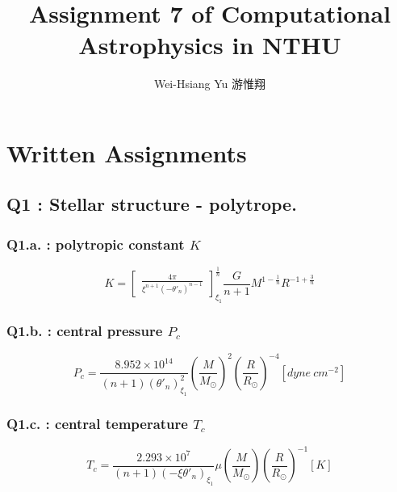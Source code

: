 \documentclass{article}
\title{Assignment 7 of Computational Astrophysics in NTHU}
\author{Wei-Hsiang Yu 游惟翔}
\affil{Department of Physics, National Tsing Hua University, Hsinchu, Taiwan}
\begin{document}
\begin{CJK}{UTF8}{bsmi}
\maketitle
\end{CJK}


\section{Written Assignments}
\subsection*{Q1 : Stellar structure - polytrope.}
\subsubsection*{Q1.a. : polytropic constant $K$}
\begin{equation}
    K=\begin{bmatrix}
        \frac{4\pi}{\xi^{n+1}(-\theta'_n)^{n-1}}
        \end{bmatrix}_{\xi_1}^{\frac{1}{n}}
      \frac{G}{n+1}M^{1-\frac{1}{n}}R^{-1+\frac{3}{n}}
      \label{eq:K}
\end{equation}

\subsubsection*{Q1.b. : central pressure $P_c$}
\begin{equation}
    P_{c}=\frac{8.952\times10^{14}}{(n+1)(\theta'_n)^2_{\xi_{1}}}
          (\frac{M}{M_{\odot}})^2(\frac{R}{R_{\odot}})^{-4}[dyne\ cm^{-2}]
    \label{eq:Pc}
\end{equation}

\subsubsection*{Q1.c. : central temperature $T_c$}
\begin{equation}
    T_c=\frac{2.293\times10^7}{(n+1)(-\xi\theta'_n)_{\xi_1}}\mu 
         (\frac{M}{M_{\odot}})(\frac{R}{R_{\odot}})^{-1}[K]
    \label{eq:Tc}
\end{equation}
\end{document}

